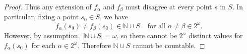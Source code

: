 \documentclass{article}
\begin{document}
\begin{enumerate}[label={\bf Q\arabic*:}]
\begin{enumerate}
\begin{proof}
          Thus any extension of $f_\alpha$ and $f_\beta$ must disagree at
          every point $s$ in $S$. In particular, fixing a point $s_0\in
          S$, we have
          \begin{equation*}
            f_\alpha(s_0)\neq f_\beta(s_0)\in\mathbb{N}\cup S\;\;\;\;
            \text{for all}\; \alpha\neq\beta\in2^\omega.
          \end{equation*}
          However, by assumption, $|\mathbb{N}\cup S|=\omega$, so there
          cannot be $2^\omega$ distinct values for $f_\alpha(s_0)$ for each
          $\alpha\in2^\omega$. Therefore $\mathbb{N}\cup S$ cannot be
          countable.
        \end{proof}
    \end{enumerate}
\end{enumerate}
\end{document}
